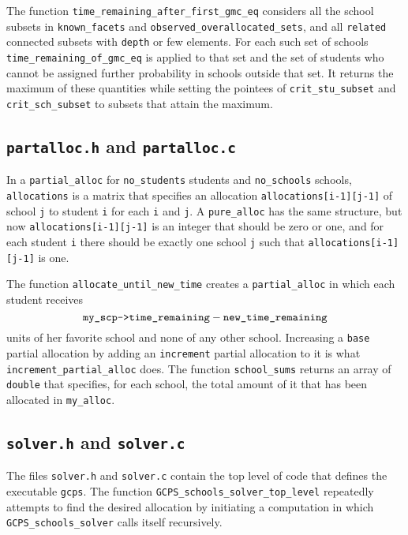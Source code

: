 \documentclass[12pt]{article}
\theoremstyle{definition}
\begin{document}
\begin{appendix}
The function \texttt{time\_remaining\_after\_first\_gmc\_eq} considers
all the school subsets in \texttt{known\_facets} and
\texttt{observed\_overallocated\_sets}, and all \texttt{related}
connected subsets with \texttt{depth} or few elements.  For each such
set of schools \texttt{time\_remaining\_of\_gmc\_eq} is applied to
that set and the set of students who cannot be assigned further
probability in schools outside that set.  It returns the maximum of
these quantities while setting the pointees of
\texttt{crit\_stu\_subset} and \texttt{crit\_sch\_subset} to subsets
that attain the maximum.

\subsection{\texttt{partalloc.h} and \texttt{partalloc.c}}

In a \texttt{partial\_alloc} for \texttt{no\_students} students and
\texttt{no\_schools} schools, \texttt{allocations} is a matrix that
specifies an allocation \texttt{allocations[i-1][j-1]} of school
\texttt{j} to student \texttt{i} for each \texttt{i} and \texttt{j}.
A \texttt{pure\_alloc} has the same structure, but now
\texttt{allocations[i-1][j-1]} is an integer that should be zero or
one, and for each student \texttt{i} there should be exactly one
school \texttt{j} such that \texttt{allocations[i-1][j-1]} is one.

The function
\texttt{allocate\_until\_new\_time} creates a \texttt{partial\_alloc}
in which each student receives
$$\text{\texttt{my\_scp->time\_remaining}} -
\text{\texttt{new\_time\_remaining}}$$ units of her favorite school
and none of any other school.  Increasing a \texttt{base} partial
allocation by adding an \texttt{increment} partial allocation to it is
what \texttt{increment\_partial\_alloc} does.  The function
\texttt{school\_sums} returns an array of \texttt{double} that
specifies, for each school, the total amount of it that has been
allocated in \texttt{my\_alloc}.

\subsection{\texttt{solver.h} and \texttt{solver.c}} \label{subsec:Solver}

The files \texttt{solver.h} and \texttt{solver.c} contain the top
level of code that defines the executable \texttt{gcps}.  The function
\texttt{GCPS\_schools\_solver\_top\_level} repeatedly attempts to find
the desired allocation by initiating a computation in which
\texttt{GCPS\_schools\_solver} calls itself recursively.


\end{appendix}
\end{document}
